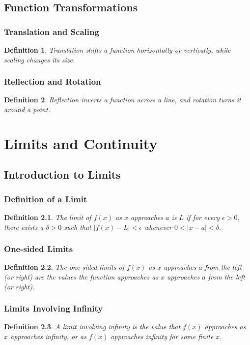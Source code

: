 \documentclass[a4paper,12pt]{book}
\newtheorem{definition}{Definition}
\begin{document}
\section{Function Transformations}
\subsection{Translation and Scaling}
\begin{definition}
Translation shifts a function horizontally or vertically, while scaling changes its size.
\end{definition}

\subsection{Reflection and Rotation}
\begin{definition}
Reflection inverts a function across a line, and rotation turns it around a point.
\end{definition}

\chapter{Limits and Continuity}
\section{Introduction to Limits}
\subsection{Definition of a Limit}
\begin{definition}
The limit of \( f(x) \) as \( x \) approaches \( a \) is \( L \) if for every \( \epsilon > 0 \), there exists a \( \delta > 0 \) such that \( |f(x) - L| < \epsilon \) whenever \( 0 < |x - a| < \delta \).
\end{definition}

\subsection{One-sided Limits}
\begin{definition}
The one-sided limits of \( f(x) \) as \( x \) approaches \( a \) from the left (or right) are the values the function approaches as \( x \) approaches \( a \) from the left (or right).
\end{definition}

\subsection{Limits Involving Infinity}
\begin{definition}
A limit involving infinity is the value that \( f(x) \) approaches as \( x \) approaches infinity, or as \( f(x) \) approaches infinity for some finite \( x \).
\end{definition}
\end{document}
